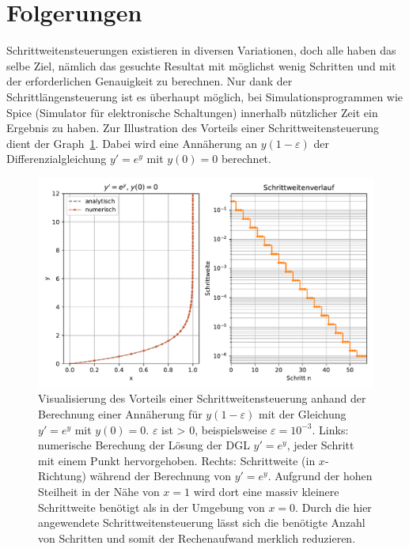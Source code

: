 %
%
%
\section{Folgerungen
\label{steps:section:folgerungen}}
Schrittweitensteuerungen existieren in diversen Variationen, doch alle haben das selbe Ziel, nämlich
das gesuchte Resultat mit möglichst wenig Schritten und mit der erforderlichen Genauigkeit zu berechnen.
Nur dank der Schrittlängensteuerung ist es überhaupt möglich, bei Simulationsprogrammen wie Spice (Simulator für elektronische Schaltungen)
innerhalb nützlicher Zeit ein Ergebnis zu haben. Zur Illustration des Vorteils einer Schrittweitensteuerung dient der Graph~\ref{buch:steps:beispielfuerssc}.
Dabei wird eine Annäherung an $y(1-\varepsilon)$ der Differenzialgleichung $y'=e^y$ mit $y(0)=0$ berechnet.

\begin{figure}
    \centering
    \includegraphics[width=\textwidth]{papers/steps/img/example_for_ssc.pdf}
    \caption{Visualisierung des Vorteils einer Schrittweitensteuerung anhand der Berechnung einer Annäherung für
    $y(1-\varepsilon)$ mit der Gleichung $y'=e^y$ mit $y(0)=0$.
    $\varepsilon$ ist > $0$, beispielsweise $\varepsilon = 10^{-3}$.
    Links: numerische Berechung der Lösung der DGL $y'=e^y$, jeder Schritt mit einem Punkt hervorgehoben.
    Rechts: Schrittweite (in $x$-Richtung) während der Berechnung von $y'=e^y$.
    Aufgrund der hohen Steilheit in der Nähe von $x=1$ wird dort eine massiv kleinere Schrittweite benötigt
    als in der Umgebung von $x=0$. Durch die hier angewendete Schrittweitensteuerung lässt sich die benötigte
    Anzahl von Schritten und somit der Rechenaufwand merklich reduzieren.
    \label{buch:steps:beispielfuerssc}}
\end{figure}


